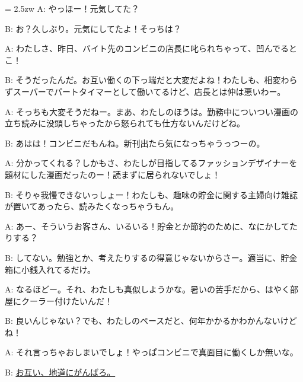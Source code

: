 \documentclass[11pt]{amsart}
\title{}
\author{}
\newenvironment{hangall}[1]{\hangindent = 2.5zw\everypar{\hangindent = 2.5zw}}{}
\begin{document}
\maketitle
\begin{hangall}{}%
A: やっほー！元気してた？

B: お？久しぶり。元気にしてたよ！そっちは？

A: わたしさ、昨日、バイト先のコンビニの店長に叱られちゃって、凹んでるとこ！

B: そうだったんだ。お互い働くの下っ端だと大変だよね！わたしも、相変わらずスーパーでパートタイマーとして働いてるけど、店長とは仲は悪いわー。

A: そっちも大変そうだねー。まあ、わたしのほうは。勤務中についつい漫画の立ち読みに没頭しちゃったから怒られても仕方ないんだけどね。

B: あはは！コンビニだもんね。新刊出たら気になっちゃうっつーの。

A: 分かってくれる？しかもさ、わたしが目指してるファッションデザイナーを題材にした漫画だったのー！読まずに居られないでしょ！

B: そりゃ我慢できないっしょー！わたしも、趣味の貯金に関する主婦向け雑誌が置いてあったら、読みたくなっちゃうもん。

A: あー、そういうお客さん、いるいる！貯金とか節約のために、なにかしてたりする？

B: してない。勉強とか、考えたりするの得意じゃないからさー。適当に、貯金箱に小銭入れてるだけ。

A: なるほどー。それ、わたしも真似しようかな。暑いの苦手だから、はやく部屋にクーラー付けたいんだ！

B: 良いんじゃない？でも、わたしのペースだと、何年かかるかわかんないけどね！

A: それ言っちゃおしまいでしょ！やっぱコンビニで真面目に働くしか無いな。

B: \ul{お互い、地道にがんばろ。}\end{hangall}
\end{document}
